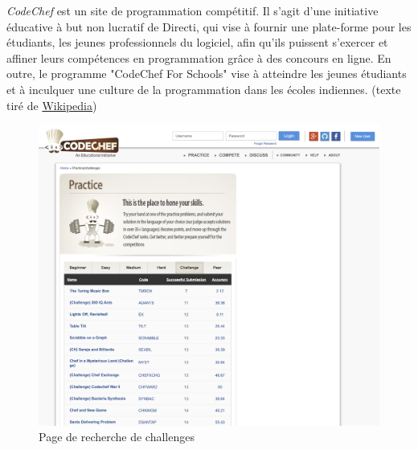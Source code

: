 \textit{CodeChef} est un site de programmation compétitif. Il s'agit d'une initiative éducative à but non lucratif de Directi, qui vise à fournir une plate-forme pour les étudiants, les jeunes professionnels du logiciel, afin qu'ils puissent s'exercer et affiner leurs compétences en programmation grâce à des concours en ligne. En outre, le programme "CodeChef For Schools" vise à atteindre les jeunes étudiants et à inculquer une culture de la programmation dans les écoles indiennes. (texte tiré de \href{https://en.wikipedia.org/wiki/CodeChef}{Wikipedia})

\begin{figure}[H]
    \includegraphics[width=\textwidth,height=0.6\textheight,keepaspectratio]{images/comparison/codechef-1.png}
    \centering
    \caption[Codechef : page de recherche de challenges]{Page de recherche de challenges}
\end{figure}

